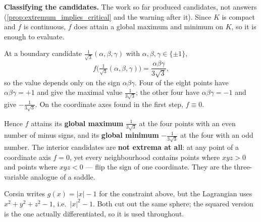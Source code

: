 \begin{exercisesolution}[Proof of \cref{ex:xyz_on_ball}]
\textbf{Classifying the candidates.} The work so far produced candidates, not answers
(\cref{prop:extremum_implies_critical} and the warning after it). Since $K$ is compact and $f$
is continuous, $f$ does attain a global maximum and minimum on $K$, so it is enough to evaluate.

At a boundary candidate $\tfrac{1}{\sqrt3}(\alpha,\beta,\gamma)$ with
$\alpha,\beta,\gamma \in \{\pm1\}$,
\[f\Big(\tfrac{1}{\sqrt3}(\alpha,\beta,\gamma)\Big)
  = \frac{\alpha\beta\gamma}{3\sqrt3},\]
so the value depends only on the sign $\alpha\beta\gamma$. Four of the eight points have
$\alpha\beta\gamma = +1$ and give the maximal value $\tfrac{1}{3\sqrt3}$; the other four have
$\alpha\beta\gamma = -1$ and give $-\tfrac{1}{3\sqrt3}$. On the coordinate axes found in the
first step, $f \equiv 0$.

Hence $f$ attains its \textbf{global maximum} $\tfrac{1}{3\sqrt3}$ at the four points with an
even number of minus signs, and its \textbf{global minimum} $-\tfrac{1}{3\sqrt3}$ at the four
with an odd number. The interior candidates are \textbf{not extrema at all}: at any point of a
coordinate axis $f=0$, yet every neighbourhood contains points where $xyz>0$ and points where
$xyz<0$ --- flip the sign of one coordinate. They are the three-variable analogue of a saddle.
\end{exercisesolution}

\begin{ainote}
Corsin writes $g(x) = |x| - 1$ for the constraint above, but the Lagrangian uses
$x^2+y^2+z^2-1$, i.e.\ $|x|^2-1$. Both cut out the same sphere; the squared version is the one
actually differentiated, so it is used throughout.
\end{ainote}

